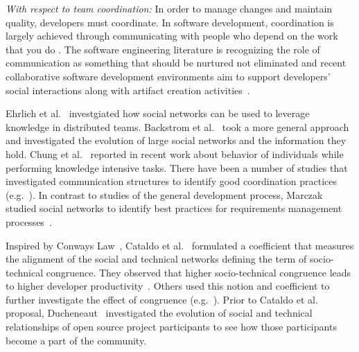 \emph{With respect to team coordination:}
In
order to manage changes and maintain quality, developers must coordinate. In
software development, coordination is largely achieved through communicating with
people who depend on the work that you do \cite{kraut:1995coordination}. The
software engineering literature is recognizing the role of communication as
something that should be nurtured not eliminated and recent
collaborative software development environments aim to support developers'
social interactions along with artifact creation activities~\cite{nakakoji2010:rdc}.


Ehrlich et al.~\cite{ehrlich:icgse:2006} investgiated how social networks can be
used to leverage knowledge in distributed teams. Backstrom et
al.~\cite{backstrom:kdd:2006} took a more general approach and investigated the
evolution of large social networks and the information they hold. Chung et
al.~\cite{chung:cpr:07} reported in recent work about behavior of individuals
while performing knowledge intensive tasks. There have been a number of studies
that investigated communication structures to identify good
coordination practices
(e.g.~\cite{hinds:cscw:2006,hossain:cscw:2006,bird:fse:2008,hinds:hicss:2008}). In contrast to studies of the general development process, Marczak studied social
networks to identify best practices for requirements management
processes~\cite{marczak:re:2008}.

Inspired by Conways Law~\cite{conway:datamination:1968}, Cataldo et
al.~\cite{cataldo:cscw:2006,cataldo:esem:2008} formulated a coefficient that
measures the alignment of the social and technical networks defining the term of
socio-technical congruence. They observed that higher socio-technical congruence
leads to higher developer
productivity~\cite{cataldo:cscw:2006,cataldo:esem:2008}. Others used this
notion and coefficient to further investigate the effect of congruence
(e.g.~\cite{valetto:msr:2007}). Prior to Cataldo et
al.~\cite{cataldo:cscw:2006,cataldo:esem:2008} proposal,
Ducheneaut~\cite{ducheneaut:cscw:2005} investigated the evolution of social and
technical relationships of open source project participants to see how those
participants become a part of the community.


